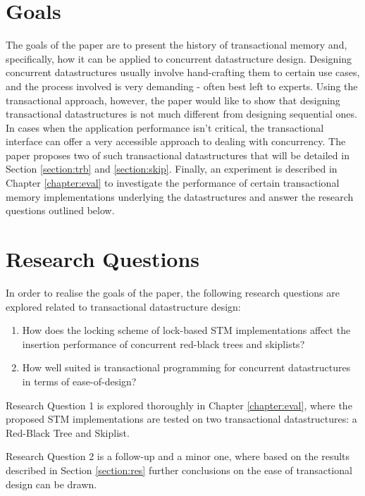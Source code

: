 \section{Goals}
The goals of the paper are to present the history of transactional memory and, specifically, how it can be applied to concurrent datastructure design. Designing concurrent datastructures usually involve hand-crafting them to certain use cases, and the process involved is very demanding - often best left to experts. Using the transactional approach, however, the paper would like to show that designing transactional datastructures is not much different from designing sequential ones. In cases when the application performance isn't critical, the transactional interface can offer a very accessible approach to dealing with concurrency. The paper proposes two of such transactional datastructures that will be detailed in Section \ref{section:trb} and \ref{section:skip}. Finally, an experiment is described in Chapter \ref{chapter:eval} to investigate the performance of certain transactional memory implementations underlying the datastructures and answer the research questions outlined below.

\section{Research Questions}
In order to realise the goals of the paper, the following research questions are explored related to transactional datastructure design:

\begin{enumerate}
    \item How does the locking scheme of lock-based STM implementations affect the insertion performance of concurrent red-black trees and skiplists?
    \item How well suited is transactional programming for concurrent datastructures in terms of ease-of-design?
\end{enumerate}

Research Question 1 is explored thoroughly in Chapter \ref{chapter:eval}, where the proposed STM implementations are tested on two transactional datastructures: a Red-Black Tree and Skiplist.

Research Question 2 is a follow-up and a minor one, where based on the results described in Section \ref{section:res} further conclusions on the ease of transactional design can be drawn.

